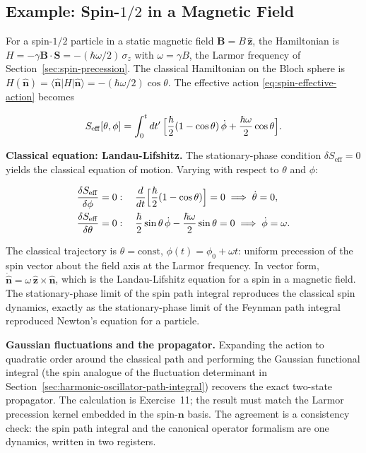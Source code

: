 \subsection{Example: Spin-$1/2$ in a Magnetic Field}

For a spin-$1/2$ particle in a static magnetic field $\bm B = B\,\hat{\bm z}$, the Hamiltonian is $H = -\gamma\bm B\!\cdot\!\bm S = -(\hbar\omega/2)\,\sigma_{z}$ with $\omega = \gamma B$, the Larmor frequency of Section~\ref{sec:spin-precession}. The classical Hamiltonian on the Bloch sphere is $H(\hat{\bm n}) = \langle\hat{\bm n}|H|\hat{\bm n}\rangle = -(\hbar\omega/2)\cos\theta$. The effective action \eqref{eq:spin-effective-action} becomes
\begin{linenomath}
\begin{equation}
S_{\mathrm{eff}}[\theta,\phi] = \int_{0}^{t} dt'\,\Bigl[
\frac{\hbar}{2}(1-\cos\theta)\,\dot{\phi} + \frac{\hbar\omega}{2}\cos\theta\Bigr] .
\label{eq:spin-action-magnetic}
\end{equation}
\end{linenomath}

\medskip\noindent\textbf{Classical equation: Landau-Lifshitz.} The stationary-phase condition $\delta S_{\mathrm{eff}} = 0$ yields the classical equation of motion. Varying with respect to $\theta$ and $\phi$:
\begin{linenomath}
\begin{align}
\frac{\delta S_{\mathrm{eff}}}{\delta\phi} = 0 &: \quad \frac{d}{dt}\Bigl[\frac{\hbar}{2}(1-\cos\theta)\Bigr] = 0
\;\Longrightarrow\; \dot{\theta} = 0, \\
\frac{\delta S_{\mathrm{eff}}}{\delta\theta} = 0 &: \quad \frac{\hbar}{2}\sin\theta\,\dot{\phi} - \frac{\hbar\omega}{2}\sin\theta = 0
\;\Longrightarrow\; \dot{\phi} = \omega .
\end{align}
\end{linenomath}
The classical trajectory is $\theta = \text{const}$, $\phi(t) = \phi_{0} + \omega t$: uniform precession of the spin vector about the field axis at the Larmor frequency. In vector form, $\dot{\hat{\bm n}} = \omega\,\hat{\bm z}\times\hat{\bm n}$, which is the Landau-Lifshitz equation for a spin in a magnetic field. The stationary-phase limit of the spin path integral reproduces the classical spin dynamics, exactly as the stationary-phase limit of the Feynman path integral reproduced Newton's equation for a particle.

\medskip\noindent\textbf{Gaussian fluctuations and the propagator.} Expanding the action to quadratic order around the classical path and performing the Gaussian functional integral (the spin analogue of the fluctuation determinant in Section~\ref{sec:harmonic-oscillator-path-integral}) recovers the exact two-state propagator. The calculation is Exercise~11; the result must match the Larmor precession kernel embedded in the spin-$\bm n$ basis. The agreement is a consistency check: the spin path integral and the canonical operator formalism are one dynamics, written in two registers.

